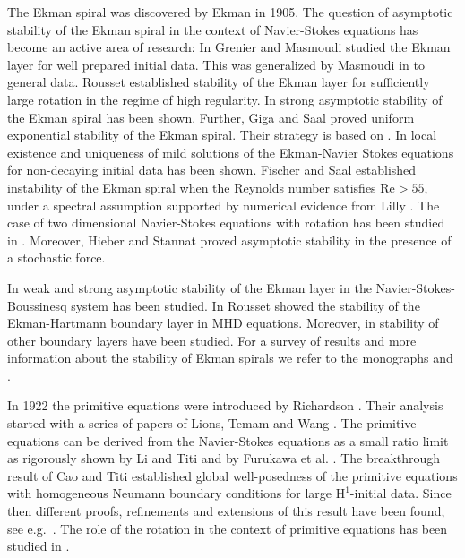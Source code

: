 \documentclass[preprint]{elsarticle}
\numberwithin{equation}{section}
\renewcommand{\Re}{\mathrm{Re}}
\renewcommand{\H}{\mathrm{H}}
\newcommand{\rH}{\H}
\begin{document}
\medskip 

The Ekman spiral was discovered by Ekman \cite{Ekm:05_2} in 1905. The question of asymptotic stability of the Ekman spiral in the context of Navier-Stokes equations has become an active area of research: 
In \cite{GM:97_2} Grenier and Masmoudi studied the Ekman layer for well prepared initial data.   
This was generalized by Masmoudi in \cite{Mas:00_2} to general data. 
Rousset \cite{Rou:04a_2} established stability of the Ekman layer for sufficiently large rotation in the regime of high regularity. 
In \cite{HHMS:10_2} strong asymptotic stability of the Ekman spiral has been shown. 
Further, Giga and Saal \cite{GS:15_2} proved uniform exponential stability of the Ekman spiral. Their strategy is based on \cite{GS:13_2}.  
In \cite{GIMMS:07_2} local existence and uniqueness of mild solutions of the Ekman-Navier Stokes equations for non-decaying initial data has been shown. 
Fischer and Saal \cite{FS:13_2} established instability of the Ekman spiral when the Reynolds number satisfies $\Re > 55$, under a spectral assumption supported by numerical evidence from Lilly \cite{Lil:66_2}.
The case of two dimensional Navier-Stokes equations with rotation has been studied in \cite{CDGG:02_2}. %
Moreover, Hieber and Stannat \cite{HS:13_2} proved asymptotic stability in the presence of a stochastic force.  

In \cite{Kob:14_2} weak and strong asymptotic stability of the Ekman layer in the Navier-Stokes-Boussinesq system has been studied. 
In \cite{Rou:05_2} Rousset showed the stability of the Ekman-Hartmann boundary layer in MHD equations.
Moreover, in \cite{DDG:99_2, DG:03_2, Rou:04b_2, DGV:17_2} stability of other boundary layers have been studied. 
For a survey of results and more information about the stability of Ekman spirals we refer to the monographs \cite{CDGG:06_2} and \cite{Kob:14_2}. 


\smallskip 

In 1922 the primitive equations were introduced by Richardson \cite{Ric:22_2}. 
Their analysis started with a series of papers of Lions, Temam and Wang \cite{LTW:92a_2,LTW:92b_2,LTW:93_2,LTW:95_2}. 
The primitive equations can be derived from the Navier-Stokes equations as a small ratio limit as rigorously shown by Li and Titi \cite{LT:19_2, LTG:22_2} and by Furukawa et al. \cite{FGHHKW:20_2,FGK:21_2,FGHHKW:25_2}. 
The breakthrough result of Cao and Titi \cite{CT:07_2} established global well-posedness of the primitive equations with homogeneous Neumann boundary conditions for large $\rH^1$-initial data. Since then different proofs, refinements and extensions of this result have been found, see e.g.~\cite{Kob:07_2,KZ:07_2,HK:16_2,GGHHK:20_2,GHK:17_2, HHK:16_2, CLT:15_2, CLT:14a_2, CLT:14b_2, CLT:17_2, BH:22_2}.
The role of the rotation in the context of primitive equations has been studied in \cite{GILT:22_2}. 
\end{document}
